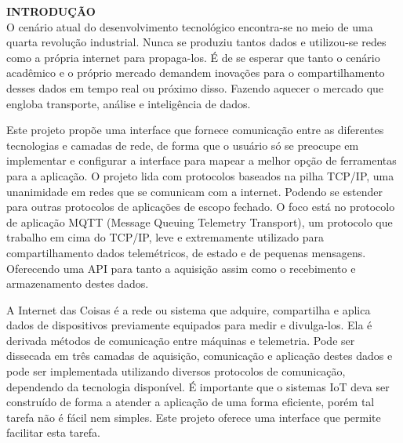 \noindent\textbf{INTRODUÇÃO}
$\!$\\

O cenário atual do desenvolvimento tecnológico encontra-se no meio de uma quarta revolução industrial. Nunca se produziu tantos dados e utilizou-se redes como a própria internet para propaga-los. É de se esperar que tanto o cenário acadêmico e o próprio mercado demandem inovações para o compartilhamento desses dados em tempo real ou próximo disso. Fazendo aquecer o mercado que engloba transporte, análise e inteligência de dados.

Este projeto propõe uma interface que fornece comunicação entre as diferentes tecnologias e camadas de rede, de forma que o usuário só se preocupe em  implementar e configurar a interface para mapear a melhor opção de ferramentas para a aplicação. O projeto lida com protocolos baseados na pilha TCP/IP, uma unanimidade em redes que se comunicam com a internet. Podendo se estender para outras protocolos de aplicações de escopo fechado. O foco está no protocolo de aplicação MQTT (Message Queuing Telemetry Transport), um protocolo que trabalho em cima do TCP/IP, leve e extremamente utilizado para compartilhamento dados telemétricos, de estado e de pequenas mensagens. Oferecendo uma API para tanto a aquisição assim como o recebimento e armazenamento destes dados.

A Internet das Coisas é a rede ou sistema que adquire, compartilha e aplica dados de dispositivos previamente equipados para medir e divulga-los. Ela é derivada métodos de comunicação entre máquinas e telemetria. Pode ser dissecada em três camadas de aquisição, comunicação e aplicação destes dados e pode ser implementada utilizando diversos protocolos de comunicação, dependendo da tecnologia disponível. É importante que o sistemas IoT deva ser construído de forma a atender a aplicação de uma forma eficiente, porém tal tarefa não é fácil nem simples. Este projeto oferece uma interface que permite facilitar esta tarefa.


 